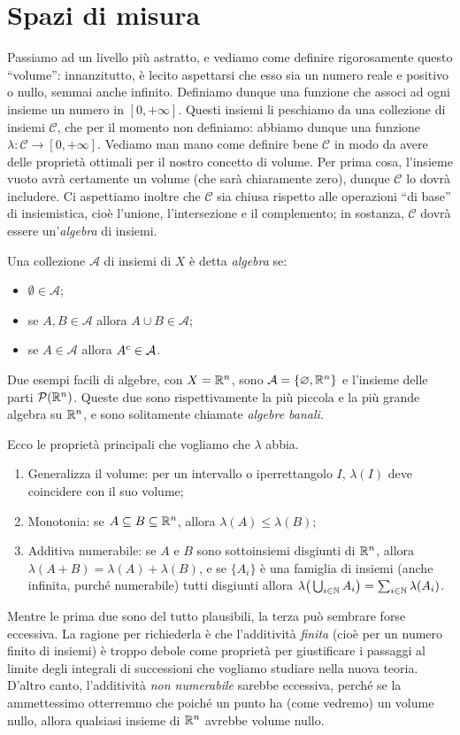 \section{Spazi di misura}
Passiamo ad un livello più astratto, e vediamo come definire rigorosamente questo ``volume'': innanzitutto, è lecito aspettarsi che esso sia un numero reale e positivo o nullo, semmai anche infinito.
Definiamo dunque una funzione che associ ad ogni insieme un numero in $[0,+\infty]$.
Questi insiemi li peschiamo da una collezione di insiemi $\mathcal C$, che per il momento non definiamo: abbiamo dunque una funzione $\lambda\colon\mathcal C\to[0,+\infty]$.
Vediamo man mano come definire bene $\mathcal C$ in modo da avere delle proprietà ottimali per il nostro concetto di volume.
Per prima cosa, l'insieme vuoto avrà certamente un volume (che sarà chiaramente zero), dunque $\mathcal C$ lo dovrà includere.
Ci aspettiamo inoltre che $\mathcal C$ sia chiusa rispetto alle operazioni ``di base'' di insiemistica, cioè l'unione, l'intersezione e il complemento; in sostanza, $\mathcal C$ dovrà essere un'\emph{algebra} di insiemi.
\begin{definizione} \label{d:algebra}
	Una collezione $\mathcal A$ di insiemi di $X$ è detta \emph{algebra} se:
	\begin{itemize}
		\item $\emptyset\in\mathcal A$;
		\item se $A,B\in\mathcal A$ allora $A\cup B\in\mathcal A$;
		\item se $A\in\mathcal A$ allora ${A}^c\in\mathcal A$.
	\end{itemize}
\end{definizione}
Due esempi facili di algebre, con $X=\mathbb{R}^n$, sono $\mathcal A=\{\varnothing,\mathbb{R}^n\}$ e l'insieme delle parti $\mathcal P(\mathbb{R}^n)$.
Queste due sono rispettivamente la più piccola e la più grande algebra su $\mathbb{R}^n$, e sono solitamente chiamate \emph{algebre banali}.

Ecco le proprietà principali che vogliamo che $\lambda$ abbia.
\begin{enumerate}
	\item Generalizza il volume: per un intervallo o iperrettangolo $I$, $\lambda(I)$ deve coincidere con il suo volume;
	\item Monotonia: se $A\subseteq B\subseteq\mathbb{R}^n$, allora $\lambda(A)\leq\lambda(B)$;
	\item Additiva numerabile: se $A$ e $B$ sono sottoinsiemi disgiunti di $\mathbb{R}^n$, allora $\lambda(A+B)=\lambda(A)+\lambda(B)$, e se $\{A_i\}$ è una famiglia di insiemi (anche infinita, purch\'e numerabile) tutti disgiunti allora $\lambda\big(\bigcup_{i\in\mathbb{N}}A_i\big)=\sum_{i\in\mathbb{N}}\lambda(A_i)$.
\end{enumerate}
Mentre le prima due sono del tutto plausibili, la terza può sembrare forse eccessiva.
La ragione per richiederla è che l'additività \emph{finita} (cioè per un numero finito di insiemi) è troppo debole come proprietà per giustificare i passaggi al limite degli integrali di successioni che vogliamo studiare nella nuova teoria.
D'altro canto, l'additività \emph{non numerabile} sarebbe eccessiva, perch\'e se la ammettessimo otterremmo che poich\'e un punto ha (come vedremo) un volume nullo, allora qualsiasi insieme di $\mathbb{R}^n$ avrebbe volume nullo.

